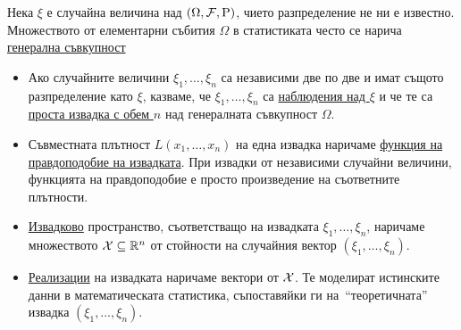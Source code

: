 \documentclass[numbers=endperiod, DIV=15, bibliography=totocnumbered]{scrartcl}
\begin{document}
\begin{definition}[Извадки]
  Нека $\xi$ е случайна величина над $(\Omega, \mathcal{F}, \operatorname{P})$, чието разпределение не ни е известно. Множеството от елементарни събития $\Omega$ в статистиката често се нарича \uline{генерална съвкупност}

  \begin{itemize}
    \item Ако случайните величини $\xi_1, \ldots, \xi_n$ са независими две по две и имат същото разпределение като $\xi$, казваме, че $\xi_1, \ldots, \xi_n$ са \uline{наблюдения над $\xi$} и че те са \uline{проста извадка с обем $n$} над генералната съвкупност $\Omega$.
    \item Съвместната плътност $L(x_1, \ldots, x_n)$ на една извадка наричаме \uline{функция на правдоподобие на извадката}. При извадки от независими случайни величини, функцията на правдоподобие е просто произведение на съответните плътности.
    \item \uline{Извадково} пространство, съответстващо на извадката $\xi_1, \ldots, \xi_n$, наричаме множеството $\mathcal{X} \subseteq \mathbb{R}^n$ от стойности на случайния вектор $(\xi_1, \ldots, \xi_n)$.
    \item \uline{Реализации} на извадката наричаме вектори от $\mathcal{X}$. Те моделират истинските данни в математическата статистика, съпоставяйки ги на~\enquote{теоретичната} извадка $(\xi_1, \ldots, \xi_n)$.
  \end{itemize}
\end{definition}
\end{document}
